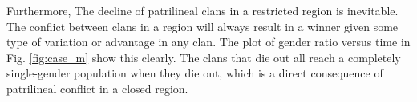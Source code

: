 \documentclass[letterpaper, 9pt, conference]{ieeeconf}  %
\begin{document}
Furthermore, The decline of patrilineal clans in a restricted region is inevitable. The conflict between clans in a region will always result in a winner given some type of variation or advantage in any clan. The plot of gender ratio versus time in Fig. \ref{fig:case_m} show this clearly. The clans that die out all reach a completely single-gender population when they die out, which is a direct consequence of patrilineal conflict in a closed region.



\end{document}
